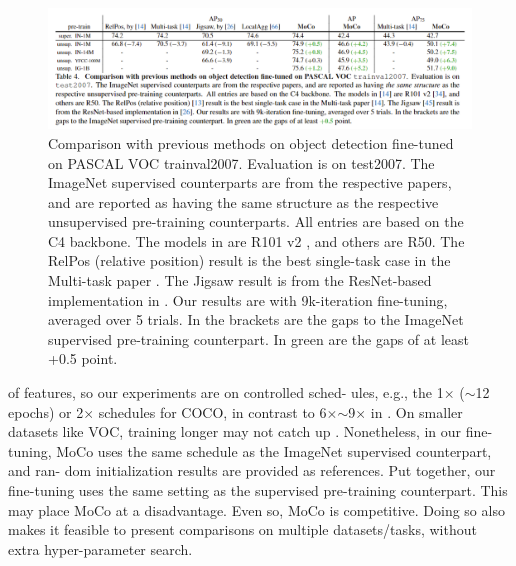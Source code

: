 \documentclass[10pt,twocolumn]{article}  %
\begin{document}
\begin{figure}[htbp]
    \centering
    \includegraphics[width=0.8\linewidth]{Pic/table4.png} %
    \caption{Comparison with previous methods on object detection ﬁne-tuned on PASCAL VOC trainval2007. Evaluation is on
    test2007. The ImageNet supervised counterparts are from the respective papers, and are reported as having the same structure as the
    respective unsupervised pre-training counterparts. All entries are based on the C4 backbone. The models in \cite{14_doersch2017multi} are R101 v2 \cite{34_he2016identity}, and
    others are R50. The RelPos (relative position) \cite{13_doersch2015unsupervised} result is the best single-task case in the Multi-task paper \cite{14_doersch2017multi}. The Jigsaw \cite{45_noroozi2016unsupervised} result is
    from the ResNet-based implementation in \cite{26_goyal2019scaling}. Our results are with 9k-iteration ﬁne-tuning, averaged over 5 trials. In the brackets are the
    gaps to the ImageNet supervised pre-training counterpart. In green are the gaps of at least +0.5 point.} %
    \label{fig:Table 4} %
\end{figure}

of features, so our experiments are on controlled sched-
ules, e.g., the 1$\times $ ($\sim $12 epochs) or 2$\times $ schedules \cite{22_girshick2018detectron} for
COCO, in contrast to 6$\times $$\sim $9$\times $ in \cite{31_he2019rethinking}. On smaller datasets
like VOC, training longer may not catch up \cite{31_he2019rethinking}.
Nonetheless, in our ﬁne-tuning, MoCo uses the same
schedule as the ImageNet supervised counterpart, and ran-
dom initialization results are provided as references.
Put together, our ﬁne-tuning uses the same setting as the
supervised pre-training counterpart. This may place MoCo
at a disadvantage. Even so, MoCo is competitive. Doing so
also makes it feasible to present comparisons on multiple
datasets/tasks, without extra hyper-parameter search.
\end{document}
